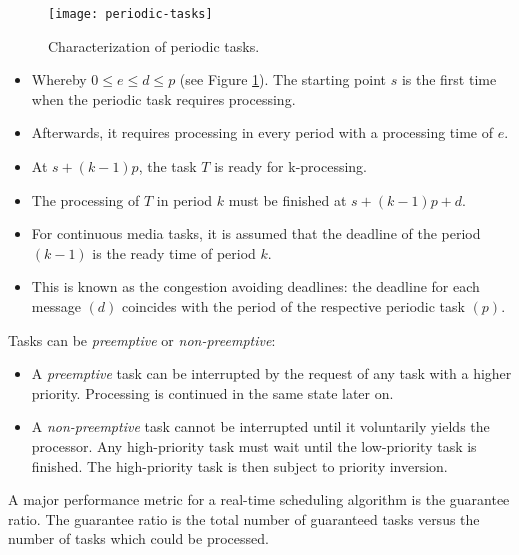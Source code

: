 \begin{figure}[ht!]
	\centering
	\texttt{[image: periodic-tasks]}
	\caption{Characterization of periodic tasks.}\label{fig:periodic-tasks}
\end{figure}

\begin{multicols}{2}
	\begin{itemize}
		\item Whereby $0 \leq e \leq d \leq p $ (see Figure {\ref{fig:periodic-tasks}}). The starting point $ s $ is the first time when the periodic task requires processing.
		\item Afterwards, it requires processing in every period with a processing time of $ e $.
		\item At $ s + (k - 1) p $, the task $ T $ is ready for k-processing.
		\item The processing of $ T $ in period $ k $ must be finished at $ s + (k - 1) p + d  $.
		\item For continuous media tasks, it is assumed that the deadline of the period $ (k - 1) $ is the ready time of period $ k $.
		\item This is known as the congestion avoiding deadlines: the deadline for each message $ (d) $
		coincides with the period of the respective periodic task $ (p) $.
	\end{itemize}
\end{multicols}


Tasks can be \textit{preemptive} or \textit{non-preemptive}:
\begin{multicols}{2}
	\begin{itemize}
		\item A \textit{preemptive} task can be interrupted by the request of any task with a higher priority. Processing is continued in the same state later on. 
		\item A \textit{non-preemptive} task cannot be interrupted until it voluntarily yields the processor. Any high-priority task must wait until the low-priority task is finished. The high-priority task is then subject to priority inversion.
	\end{itemize}
\end{multicols}

 
A major performance metric for a real-time scheduling algorithm is the guarantee ratio. The guarantee ratio is the total number of guaranteed tasks versus the number of tasks which could be processed.

